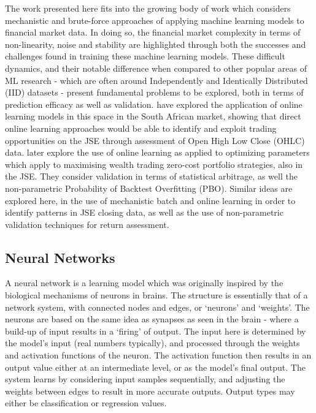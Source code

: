 \documentclass[a4paper,11pt,oneside]{article}
\theoremstyle{plain}
\theoremstyle{definition}
\begin{document}
	The work presented here fits into the growing body of work which considers mechanistic and brute-force approaches of applying 
	machine learning models to financial market data. In doing so, the financial market complexity in terms of non-linearity, noise and stability are highlighted through 
	both the successes and challenges found in training these machine learning models. These difficult dynamics, and their notable difference when 
	compared to other popular areas of ML research - which are often around Independently and Identically Distributed (IID) datasets - present fundamental problems to be explored, both 
	in terms of prediction efficacy as well as validation. \citet{Loonat} have explored the application of online learning models in this space
	 in the South African market, showing that direct online learning approaches would be able to identify and exploit trading opportunities on the JSE through assessment 
	 of Open High Low Close (OHLC) data. \citet{MurphyGebbie} later explore the use of online learning as applied to optimizing parameters which apply to maximising wealth trading zero-cost portfolio strategies, also in the JSE. They consider validation in terms of statistical arbitrage, as well the non-parametric Probability of Backtest Overfitting (PBO). Similar ideas are explored here, in the use of mechanistic batch and online learning in order to identify patterns in JSE closing data, as well as the use of non-parametric validation techniques for return assessment.
	
	\subsection{Neural Networks}\label{lr_nn}
	
	A neural network is a learning model which was originally inspired by the biological mechanisms of neurons 
	in brains. The structure is essentially that of a network system, with connected nodes and edges, or `neurons' and 
	`weights'. The neurons are based on the same idea as synapses as seen in the brain - where a build-up 
	of input results in a `firing' of output. The input here is determined by the model's input (real numbers typically), 
	and processed through the weights and activation functions of the neuron. The activation function then results in an output value 
	either at an intermediate level, or as the model's final output. The system learns by considering input samples 
	sequentially, and adjusting the weights between edges to result in more accurate outputs. Output types may either be 
	classification or regression values. 
	\hfill \break 
	
\end{document}
